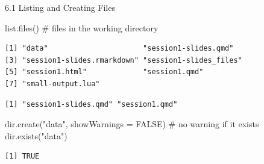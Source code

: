 \documentclass[
  ignorenonframetext,
  aspectratio=169,
]{beamer}
\newenvironment{Shaded}{\begin{snugshade}}{\end{snugshade}}
\newcommand{\AttributeTok}[1]{\textcolor[rgb]{0.40,0.45,0.13}{#1}}
\newcommand{\CommentTok}[1]{\textcolor[rgb]{0.37,0.37,0.37}{#1}}
\newcommand{\ConstantTok}[1]{\textcolor[rgb]{0.56,0.35,0.01}{#1}}
\newcommand{\FunctionTok}[1]{\textcolor[rgb]{0.28,0.35,0.67}{#1}}
\newcommand{\NormalTok}[1]{\textcolor[rgb]{0.00,0.23,0.31}{#1}}
\newcommand{\SpecialCharTok}[1]{\textcolor[rgb]{0.37,0.37,0.37}{#1}}
\newcommand{\StringTok}[1]{\textcolor[rgb]{0.13,0.47,0.30}{#1}}
\begin{document}
\begin{frame}[fragile]{6.1 Listing and Creating Files}
\protect{}\label{listing-and-creating-files}
\begin{Shaded}
\begin{Highlighting}[]
\FunctionTok{list.files}\NormalTok{()                         }\CommentTok{\# files in the working directory}
\end{Highlighting}
\end{Shaded}

\begingroup\tiny\color{darkgray}

\begin{verbatim}
[1] "data"                      "session1-slides.qmd"      
[3] "session1-slides.rmarkdown" "session1-slides_files"    
[5] "session1.html"             "session1.qmd"             
[7] "small-output.lua"         
\end{verbatim}

\endgroup

\begin{Shaded}
\end{Shaded}

\begingroup\tiny\color{darkgray}

\begin{verbatim}
[1] "session1-slides.qmd" "session1.qmd"       
\end{verbatim}

\endgroup

\begin{Shaded}
\begin{Highlighting}[]
\FunctionTok{dir.create}\NormalTok{(}\StringTok{"data"}\NormalTok{, }\AttributeTok{showWarnings =} \ConstantTok{FALSE}\NormalTok{)   }\CommentTok{\# no warning if it exists}
\FunctionTok{dir.exists}\NormalTok{(}\StringTok{"data"}\NormalTok{)}
\end{Highlighting}
\end{Shaded}

\begingroup\tiny\color{darkgray}

\begin{verbatim}
[1] TRUE
\end{verbatim}

\endgroup
\end{frame}
\end{document}
